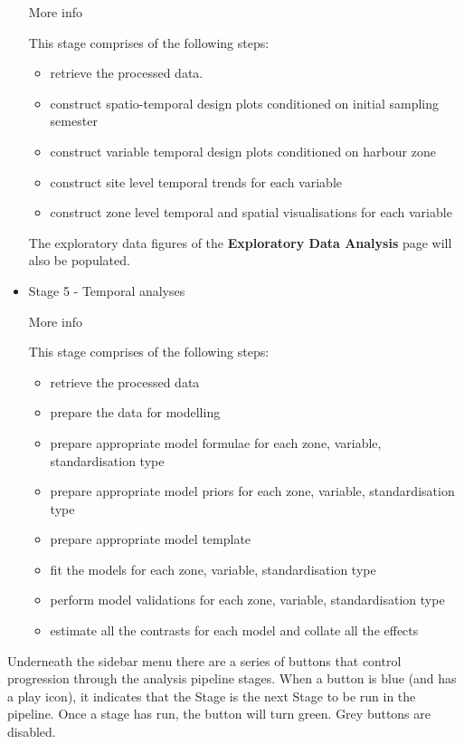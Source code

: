 \documentclass[
  8pt,
  a4paper]{article}
\providecommand{\tightlist}{%
  \setlength{\itemsep}{0pt}\setlength{\parskip}{0pt}}\usepackage{longtable,booktabs,array}
\begin{document}
\begin{itemize}
  More info

  This stage comprises of the following steps:

  \begin{itemize}
  \tightlist
  \item
    retrieve the processed data.
  \item
    construct spatio-temporal design plots conditioned on initial
    sampling semester
  \item
    construct variable temporal design plots conditioned on harbour zone
  \item
    construct site level temporal trends for each variable
  \item
    construct zone level temporal and spatial visualisations for each
    variable
  \end{itemize}

  The exploratory data figures of the \textbf{Exploratory Data Analysis}
  page will also be populated.
\item
  Stage 5 - Temporal analyses

  More info

  This stage comprises of the following steps:

  \begin{itemize}
  \tightlist
  \item
    retrieve the processed data
  \item
    prepare the data for modelling
  \item
    prepare appropriate model formulae for each zone, variable,
    standardisation type
  \item
    prepare appropriate model priors for each zone, variable,
    standardisation type
  \item
    prepare appropriate model template
  \item
    fit the models for each zone, variable, standardisation type
  \item
    perform model validations for each zone, variable, standardisation
    type
  \item
    estimate all the contrasts for each model and collate all the
    effects
  \end{itemize}
\end{itemize}

Underneath the sidebar menu there are a series of buttons that control
progression through the analysis pipeline stages. When a button is blue
(and has a play icon), it indicates that the Stage is the next Stage to
be run in the pipeline. Once a stage has run, the button will turn
green. Grey buttons are disabled.
\end{document}
